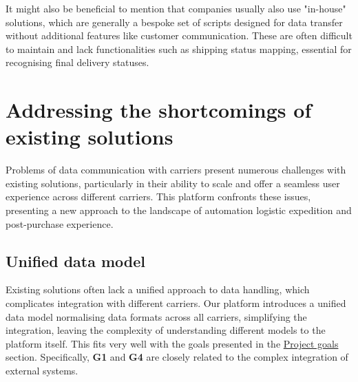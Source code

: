 
It might also be beneficial to mention that companies usually also use "in-house" solutions, which are generally a bespoke set of scripts designed for data transfer without additional features like customer communication. 
These are often difficult to maintain and lack functionalities such as shipping status mapping, essential for recognising final delivery statuses.


\section{Addressing the shortcomings of existing solutions}
\label{sec:addressing-shortcoming-existing-solutions}

Problems of data communication with carriers present numerous challenges with existing solutions, particularly in their ability to scale and offer a seamless user experience across different carriers.
This platform confronts these issues, presenting a new approach to the landscape of automation logistic expedition and post-purchase experience.

\subsection{Unified data model}
Existing solutions often lack a unified approach to data handling, which complicates integration with different carriers. 
Our platform introduces a unified data model normalising data formats across all carriers, simplifying the integration, leaving the complexity of understanding different models to the platform itself.
This fits very well with the goals presented in the \hyperref[subsec:project-goals]{Project goals} section.
Specifically, \textbf{G1} and \textbf{G4} are closely related to the complex integration of external systems.

